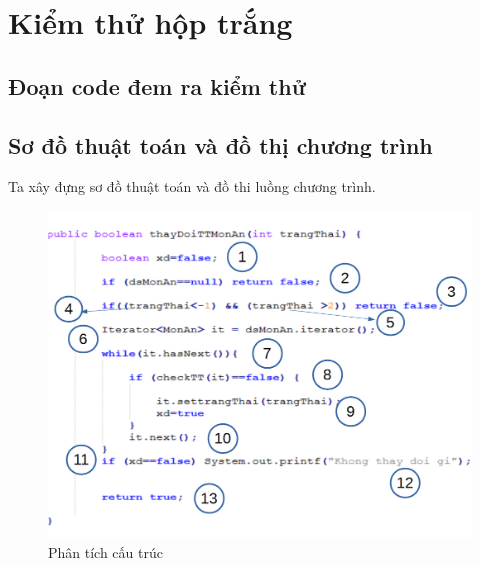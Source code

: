 \documentclass[a4paper,12pt]{report}
\begin{document}
\section{Kiểm thử hộp trắng}
\subsection{Đoạn code đem ra kiểm thử }

\subsection{Sơ đồ thuật toán và đồ thị chương trình} 
Ta xây đựng sơ đồ thuật toán và đồ thi luồng chương trình.
\begin{figure}[!]
		\centering
		\includegraphics[scale=0.5]{KTHopTrang.png}
		\caption{Phân tích cấu trúc}
\end{figure}\begin{figure}[!]
		\centering

\end{figure}
\end{document}

